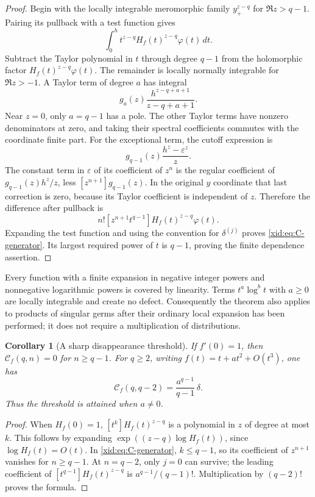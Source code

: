 \documentclass[11pt,a4paper]{article}
\numberwithin{equation}{section}
\newtheorem{corollary}[theorem]{Corollary}
\theoremstyle{definition}
\theoremstyle{remark}
\begin{document}
\begin{proof}
Begin with the locally integrable meromorphic family
$y_+^{z-q}$ for $\Re z>q-1$.  Pairing its pullback with a test function
gives
\[
 \int_0^h t^{z-q}H_f(t)^{z-q}\varphi(t)\,dt.
\]
Subtract the Taylor polynomial in $t$ through degree $q-1$ from the
holomorphic factor $H_f(t)^{z-q}\varphi(t)$.  The remainder is locally
normally integrable for $\Re z>-1$.  A Taylor term of degree $a$ has
integral
\[
 g_a(z)\frac{h^{z-q+a+1}}{z-q+a+1}.
\]
Near $z=0$, only $a=q-1$ has a pole.  The other Taylor terms have
nonzero denominators at zero, and taking their spectral coefficients
commutes with the coordinate finite part.  For the exceptional term,
the cutoff expression is
\[
 g_{q-1}(z)\frac{h^z-\varepsilon^z}{z}.
\]
The constant term in $\varepsilon$ of its coefficient of $z^n$ is the
regular coefficient of $g_{q-1}(z)h^z/z$, less
$[z^{n+1}]g_{q-1}(z)$.  In the original $y$ coordinate that last
correction is zero, because its Taylor coefficient is independent of
$z$.  Therefore the difference after pullback is
\[
 n![z^{n+1}t^{q-1}]H_f(t)^{z-q}\varphi(t).
\]
Expanding the test function and using the convention for
$\delta^{(j)}$ proves \eqref{xid:eq:C-generator}.  Its largest required
power of $t$ is $q-1$, proving the finite dependence assertion.
\end{proof}

Every function with a finite expansion in negative integer powers and
nonnegative logarithmic powers is covered by linearity.  Terms
$t^a\log^b t$ with $a\ge0$ are locally integrable and create no defect.
Consequently the theorem also applies to products of singular germs
after their ordinary local expansion has been performed; it does not
require a multiplication of distributions.

\begin{corollary}[A sharp disappearance threshold]
\label{xid:cor:monomial-threshold}
If $f'(0)=1$, then $\mathcal C_f(q,n)=0$ for $n\ge q-1$.
For $q\ge2$, writing $f(t)=t+a t^2+O(t^3)$, one has
\begin{equation}\label{xid:eq:monomial-top}
 \mathcal C_f(q,q-2)=\frac{a^{q-1}}{q-1}\,\delta.
\end{equation}
Thus the threshold is attained when $a\ne0$.
\end{corollary}

\begin{proof}
When $H_f(0)=1$, $[t^k]H_f(t)^{z-q}$ is a polynomial in $z$ of degree
at most $k$.  This follows by expanding
$\exp((z-q)\log H_f(t))$, since $\log H_f(t)=O(t)$.
In \eqref{xid:eq:C-generator}, $k\le q-1$, so its coefficient of
$z^{n+1}$ vanishes for $n\ge q-1$.  At $n=q-2$, only $j=0$ can
survive; the leading coefficient of $[t^{q-1}]H_f(t)^{z-q}$ is
$a^{q-1}/(q-1)!$.  Multiplication by $(q-2)!$ proves the formula.
\end{proof}
\end{document}

